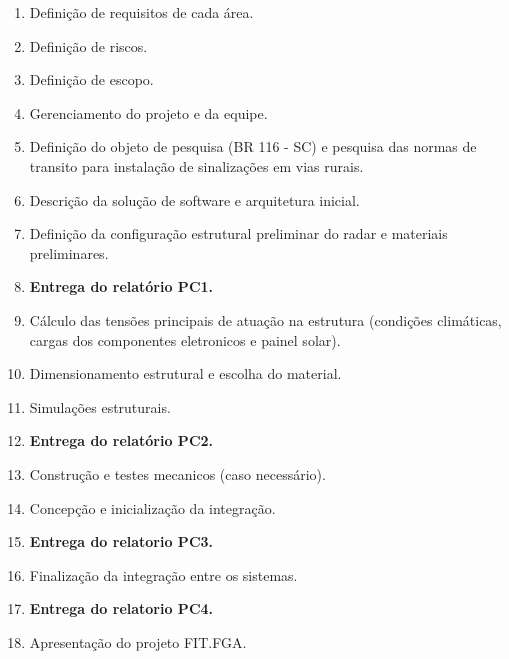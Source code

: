 \begin{enumerate}
	\item \label{geral1} Definição de requisitos de cada área.
	\item \label{geral2} Definição de riscos.
	\item \label{geral3} Definição de escopo.
	\item \label{geral4} Gerenciamento do projeto e da equipe.
	\item \label{est1} Definição do objeto de pesquisa (BR 116 - SC) e pesquisa das normas de transito para instalação de sinalizações em vias rurais.
	\item \label{sof1} Descrição da solução de software e arquitetura inicial.
	\item \label{anI} Definição da configuração estrutural preliminar do radar e materiais preliminares.
	\item \label{anII} \textbf{Entrega do relatório PC1.} 
	\item \label{anIII} Cálculo das tensões principais de atuação na estrutura (condições climáticas, cargas dos componentes eletronicos e painel solar). 
	\item \label{dI} Dimensionamento estrutural e escolha do material.
	\item \label{dII}  Simulações estruturais.
	\item \label{dIII} \textbf{Entrega do relatório PC2.} 
	\item \label{esc-tcI}  Construção e testes mecanicos (caso necessário).
	\item \label{imI} Concepção e inicialização da integração.
	\item \label{imII} \textbf{Entrega do relatorio PC3.}
	\item \label{imIII} Finalização da integração entre os sistemas.
	\item \label{tec} \textbf{Entrega do relatorio PC4.}
	\item \label{esc-tcII} Apresentação do projeto FIT.FGA.
\end{enumerate}

